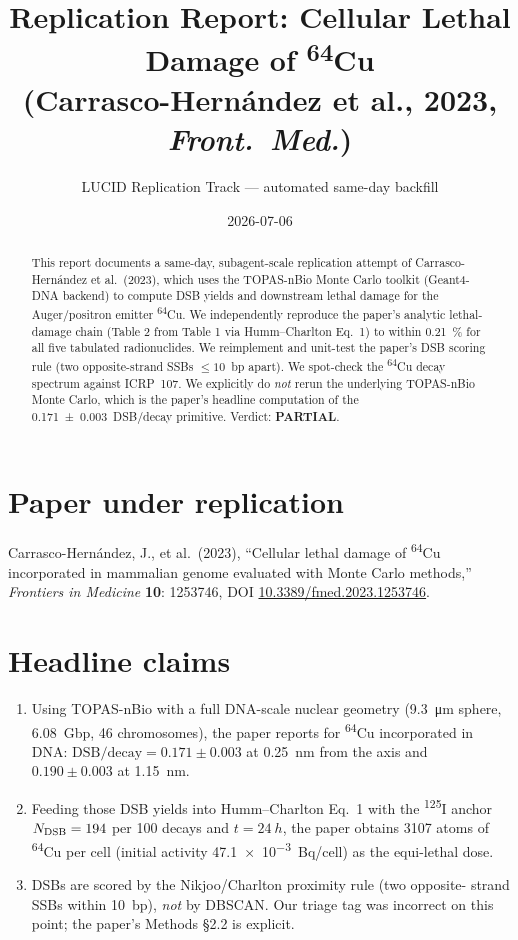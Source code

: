 \documentclass[11pt]{article}
\title{Replication Report: Cellular Lethal Damage of \textsuperscript{64}Cu\\
  \small (Carrasco-Hern\'andez et al., 2023, \emph{Front.\ Med.})}
\author{LUCID Replication Track --- automated same-day backfill}
\date{2026-07-06}
\begin{document}
\maketitle

\begin{abstract}
This report documents a same-day, subagent-scale replication attempt of
Carrasco-Hern\'andez et al.\ (2023), which uses the TOPAS-nBio Monte Carlo
toolkit (Geant4-DNA backend) to compute DSB yields and downstream lethal
damage for the Auger/positron emitter \textsuperscript{64}Cu.  We
independently reproduce the paper's analytic lethal-damage chain (Table 2 from
Table 1 via Humm--Charlton Eq.\ 1) to within \SI{0.21}{\percent} for all five
tabulated radionuclides.  We reimplement and unit-test the paper's DSB
scoring rule (two opposite-strand SSBs $\leq 10$~bp apart).  We spot-check the
\textsuperscript{64}Cu decay spectrum against ICRP~107.  We explicitly do
\emph{not} rerun the underlying TOPAS-nBio Monte Carlo, which is the paper's
headline computation of the \SI{0.171(3)}{DSB/decay} primitive.  Verdict:
\textbf{PARTIAL}.
\end{abstract}

\section{Paper under replication}
Carrasco-Hern\'andez, J., et al.\ (2023), ``Cellular lethal damage of
\textsuperscript{64}Cu incorporated in mammalian genome evaluated with
Monte Carlo methods,'' \emph{Frontiers in Medicine} \textbf{10}: 1253746,
DOI \href{https://doi.org/10.3389/fmed.2023.1253746}{10.3389/fmed.2023.1253746}.

\section{Headline claims}
\begin{enumerate}
  \item Using TOPAS-nBio with a full DNA-scale nuclear geometry (\SI{9.3}{\um}
    sphere, 6.08~Gbp, 46 chromosomes), the paper reports for
    \textsuperscript{64}Cu incorporated in DNA:
    \(\text{DSB/decay} = 0.171 \pm 0.003\) at \SI{0.25}{nm} from the axis and
    \(0.190 \pm 0.003\) at \SI{1.15}{nm}.
  \item Feeding those DSB yields into Humm--Charlton Eq.~1 with the
    \textsuperscript{125}I anchor $N_{\rm DSB}=194$ per 100 decays and
    $t=\SI{24}{h}$, the paper obtains 3107 atoms of \textsuperscript{64}Cu per
    cell (initial activity \SI{47.1e-3}{Bq/cell}) as the equi-lethal dose.
  \item DSBs are scored by the Nikjoo/Charlton proximity rule (two opposite-
    strand SSBs within 10~bp), \emph{not} by DBSCAN.  Our triage tag was
    incorrect on this point; the paper's Methods \S2.2 is explicit.
\end{enumerate}
\end{document}
